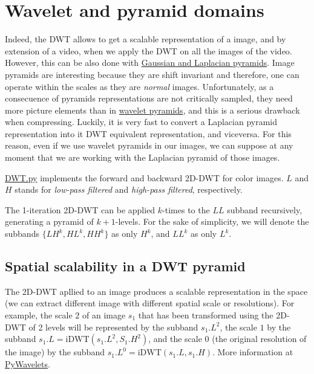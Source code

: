 \section{Wavelet and pyramid domains}
Indeed, the DWT allows to get a scalable representation of a image, and
by extension of a video, when we apply the DWT on all the images of the
video. However, this can be also done with
\href{https://en.wikipedia.org/wiki/Pyramid_(image_processing)}{Gaussian
and Laplacian pyramids}. Image pyramids are interesting because they are
shift invariant and therefore, one can operate within the scales as they
are \emph{normal} images. Unfortunately, as a consecuence of pyramids
representations are not critically sampled, they need more picture
elements than in
\href{http://www.vtvt.ece.vt.edu/research/references/video/DCT_Video_Compression/Zhang92a.pdf}{wavelet
pyramids}, and this is a serious drawback when compressing. Luckily, it
is very fast to convert a Laplacian pyramid representation into it DWT
equivalent representation, and viceversa. For this reason, even if we
use wavelet pyramids in our images, we can suppose at any moment that we
are working with the Laplacian pyramid of those images.

\href{https://github.com/vicente-gonzalez-ruiz/MCDWT/blob/master/src/DWT.py}{DWT.py}
implements the forward and backward 2D-DWT for color images. $L$ and
$H$ stands for \emph{low-pass filtered} and \emph{high-pass filtered},
respectively.



The 1-iteration 2D-DWT can be applied $k$-times to the $LL$ subband
recursively, generating a pyramid of $k+1$-levels. For the sake of
simplicity, we will denote the subbands $\{LH^k, HL^k, HH^k\}$ as only
$H^k$, and $LL^k$ as only $L^k$.

\subsection{Spatial scalability in a DWT pyramid}
The 2D-DWT apllied to an image produces a scalable representation in
the space (we can extract different image with different spatial scale
or resolutions). For example, the scale $2$ of an image $s_1$ that has
been transformed using the 2D-DWT of 2 levels will be represented by
the subband $s_1.L^2$, the scale $1$ by the subband
$s_1.L=\text{iDWT}(s_1.L^2, S_1.H^2)$, and the scale $0$ (the original
resolution of the image) by the subband $s_1.L^0=\text{iDWT}(s_1.L,
s_1.H)$. More information at
\href{https://pywavelets.readthedocs.io/en/latest/index.html}{PyWavelets}.

